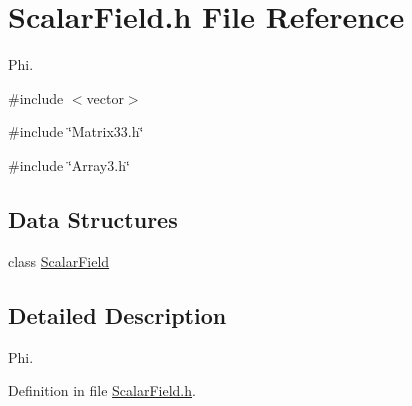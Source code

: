 \section{ScalarField.h File Reference}
\label{ScalarField_8h}


Phi.  


{\ttfamily \#include $<$vector$>$}\par
{\ttfamily \#include \char`\"{}Matrix33.h\char`\"{}}\par
{\ttfamily \#include \char`\"{}Array3.h\char`\"{}}\par
\subsection*{Data Structures}
\begin{DoxyCompactItemize}
\item 
class \hyperlink{classScalarField}{ScalarField}
\end{DoxyCompactItemize}


\subsection{Detailed Description}
Phi. 

Definition in file \hyperlink{ScalarField_8h_source}{ScalarField.h}.

